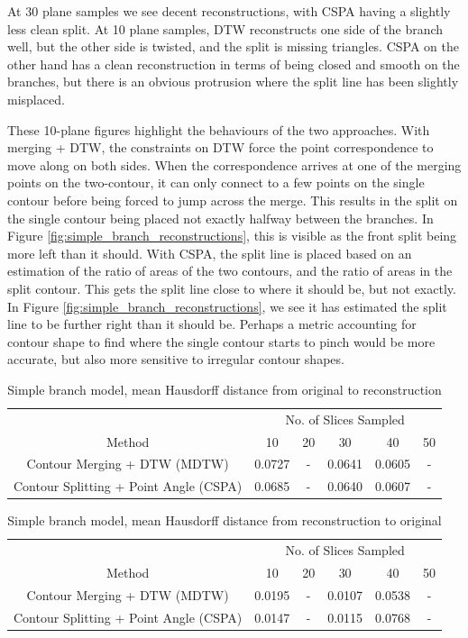 \documentclass[11p, titlepage]{article}
\begin{document}
At 30 plane samples we see decent reconstructions, with CSPA having a slightly less clean split. At 10 plane samples, DTW reconstructs one side of the branch well, but the other side is twisted, and the split is missing triangles. CSPA on the other hand has a clean reconstruction in terms of being closed and smooth on the branches, but there is an obvious protrusion where the split line has been slightly misplaced. 

These 10-plane figures highlight the behaviours of the two approaches. With merging + DTW, the constraints on DTW force the point correspondence to move along on both sides. When the correspondence arrives at one of the merging points on the two-contour, it can only connect to a few points on the single contour before being forced to jump across the merge. This results in the split on the single contour being placed not exactly halfway between the branches. In Figure \ref{fig:simple_branch_reconstructions}, this is visible as the front split being more left than it should. With CSPA, the split line is placed based on an estimation of the ratio of areas of the two contours, and the ratio of areas in the split contour. This gets the split line close to where it should be, but not exactly. In Figure \ref{fig:simple_branch_reconstructions}, we see it has estimated the split line to be further right than it should be. Perhaps a metric accounting for contour shape to find where the single contour starts to pinch would be more accurate, but also more sensitive to irregular contour shapes.

\begin{table}[h!]
\begin{tabular}{ | c | c | c | c | c | c | }
\hline
& \multicolumn{5}{c|}{No. of Slices Sampled} \\
\cline{2-6}
Method & 10 & 20 & 30 & 40 & 50 \\
\hline
Contour Merging + DTW (MDTW) & 0.0727 & - & 0.0641 & 0.0605 & - \\
Contour Splitting + Point Angle (CSPA) & 0.0685 & - & 0.0640 & 0.0607 & - \\
\hline
\end{tabular}
\caption{Simple branch model, mean Hausdorff distance from original to reconstruction}
\label{table:simple_branch_forward}
\end{table}
\FloatBarrier

\begin{table}[h!]
\begin{tabular}{ | c | c | c | c | c | c | }
\hline
& \multicolumn{5}{c|}{No. of Slices Sampled} \\
\cline{2-6}
Method & 10 & 20 & 30 & 40 & 50 \\
\hline
Contour Merging + DTW (MDTW) & 0.0195 & - & 0.0107 & 0.0538 & - \\
Contour Splitting + Point Angle (CSPA) & 0.0147 & - & 0.0115 & 0.0768 & - \\
\hline
\end{tabular}
\caption{Simple branch model, mean Hausdorff distance from reconstruction to original}
\label{table:simple_branch_reverse}
\end{table}
\FloatBarrier
\end{document}
